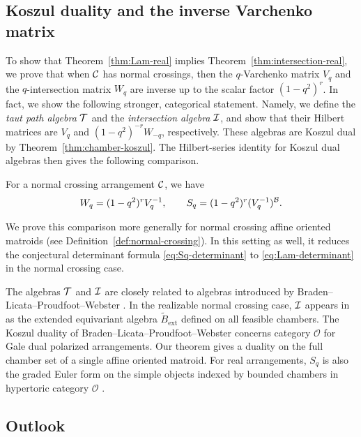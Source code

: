 \subsection{Koszul duality and the inverse Varchenko matrix}  To show that Theorem~\ref{thm:Lam-real} implies Theorem~\ref{thm:intersection-real}, we prove that when $\mathcal C$ has normal crossings, then the $q$-Varchenko matrix $V_q$ and the $q$-intersection matrix $W_q$
are inverse up to the scalar factor $(1-q^2)^r$.
In fact, we show the following stronger, categorical statement. Namely, we define the \emph{taut path algebra}
$\mathcal T$ and the \emph{intersection algebra} $\mathcal I$, and show that their Hilbert
matrices are $V_q$ and $(1-q^2)^{-r}W_{-q}$, respectively.
These algebras are Koszul dual by Theorem~\ref{thm:chamber-koszul}.
The Hilbert-series identity for Koszul dual algebras then gives the
following comparison.
\begin{theorem}\label{thm:intro-inverse}
For a normal crossing arrangement $\mathcal C$, we have
\[
 W_q=(1-q^2)^rV_q^{-1},\qquad
 S_q=(1-q^2)^r(V_q^{-1})^{\mathcal B}.
\]
\end{theorem}
We prove this comparison more generally for normal crossing affine oriented matroids (see Definition~\ref{def:normal-crossing}).
In this setting as well, it reduces the conjectural determinant formula
\eqref{eq:Sq-determinant} to \eqref{eq:Lam-determinant} in the normal
crossing case.

\begin{remark}
The algebras $\mathcal T$ and $\mathcal I$ are closely related to algebras introduced by Braden--Licata--Proudfoot--Webster
\cite{BLPWgale,BradenLicataProudfootWebster2012}. In the realizable
normal crossing case, $\mathcal I$ appears in~\cite[Section 4.5]{BLPWgale} as the extended equivariant algebra
$\widetilde B_{\mathrm{ext}}$ defined on all feasible chambers.  The Koszul duality of Braden--Licata--Proudfoot--Webster concerns category $\mathcal O$ for Gale dual polarized arrangements.
Our theorem gives a duality on the full chamber set of a single affine
oriented matroid. For real arrangements, $S_q$ is also the graded
Euler form on the simple objects indexed by bounded chambers in
hypertoric category $\mathcal O$ \cite[Theorem 3.1]{EM}.
\end{remark}

\subsection{Outlook}\label{subsec:outlook}

